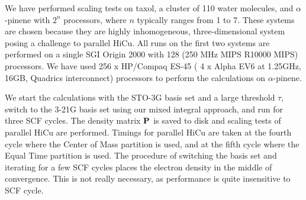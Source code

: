\commentoutA{\documentclass[prl,aps,twocolumn,showpacs,twocolumngrid,superbib]{revtex4}}
\begin{document}

We have performed scaling tests on taxol, a cluster of 110 water
molecules, and $\alpha$-pinene 
with $2^n$ processors, where $n$ typically ranges from 1 to
7.  These systems are chosen because they are highly inhomogeneous,
three-dimensional system posing a challenge to parallel HiCu.  
All runs on the first two systems are performed on a single SGI Origin 2000
with 128 (250 MHz MIPS R10000 MIPS) processors. We have used 
256 x HP/Compaq ES-45 ( 4 x Alpha EV6 at 1.25GHz, 16GB, Quadrics interconnect)
processors to perform the calculations on 
$\alpha$-pinene.

We start the calculations with the STO-3G basis set and a large 
threshold $\tau$, switch to the 3-21G basis set using our mixed
integral approach, and run for three SCF cycles.  The density matrix
${\bf P}$ is saved to disk and scaling tests of parallel HiCu are
performed.  Timings for parallel HiCu are taken at the fourth cycle where the
Center of Mass partition is used, and at the fifth cycle where the
Equal Time partition is used. The procedure of switching the basis set and 
iterating for a few SCF cycles places the electron density in the middle 
of convergence.  This is not really necessary, as performance is quite 
insensitive to SCF cycle.  
\end{document}
